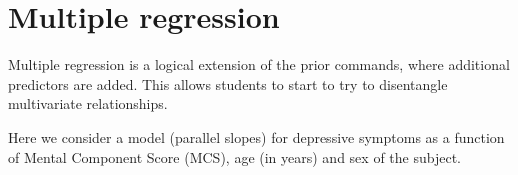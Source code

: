 \documentclass{tufte-book}\usepackage[]{graphicx}\usepackage[]{xcolor}
\begin{document}
\section{Multiple regression}
%
%

Multiple regression is a logical extension of the prior commands, where 
additional predictors are added.  This allows students to start to try to disentangle 
multivariate relationships.  


Here we consider a model (parallel slopes) for depressive symptoms as a function of Mental Component Score (MCS),
age (in years) and sex of the subject.
\end{document}
